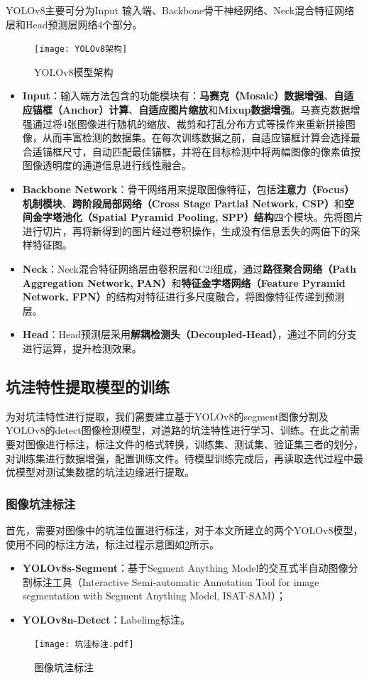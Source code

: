 \documentclass{MathorCupmodeling}
\begin{document}
	YOLOv8主要可分为Input 输入端、Backbone骨干神经网络、Neck混合特征网络层和Head预测层网络4个部分\textcolor{blue}{\cite{YOLOv8简述}}。
	\begin{figure}[H]
		\centering
		\texttt{[image: YOLOv8架构]}
		\caption{YOLOv8模型架构}
		\label{fig:YOLO架构}
	\end{figure}
	\begin{itemize}
		\item \textbf{Input}：输入端方法包含的功能模块有：\textbf{马赛克（Mosaic）数据增强}、\textbf{自适应锚框（Anchor）计算}、\textbf{自适应图片缩放}和\textbf{Mixup数据增强}\textcolor{blue}{\cite{YOLO数据增强}}。马赛克数据增强通过将4张图像进行随机的缩放、裁剪和打乱分布方式等操作来重新拼接图像，从而丰富检测的数据集。在每次训练数据之前，自适应锚框计算会选择最合适锚框尺寸，自动匹配最佳锚框，并将在目标检测中将两幅图像的像素值按图像透明度的通道信息进行线性融合。
		\item \textbf{Backbone Network}：骨干网络用来提取图像特征，包括\textbf{注意力（Focus）机制模块}、\textbf{跨阶段局部网络（Cross Stage Partial Network, CSP）}和\textbf{空间金字塔池化（Spatial Pyramid Pooling, SPP）结构}四个模块。先将图片进行切片，再将新得到的图片经过卷积操作，生成没有信息丢失的两倍下的采样特征图。
		\item \textbf{Neck}：Neck混合特征网络层由卷积层和C2f组成，通过\textbf{路径聚合网络（Path Aggregation Network, PAN）}和\textbf{特征金字塔网络（Feature Pyramid Network, FPN）}的结构对特征进行多尺度融合，将图像特征传递到预测层。
		\item \textbf{Head}：Head预测层采用\textbf{解耦检测头（Decoupled-Head）}\textcolor{blue}{\cite{Head}}，通过不同的分支进行运算，提升检测效果。
	\end{itemize}

	\subsection{坑洼特性提取模型的训练}
	为对坑洼特性进行提取，我们需要建立基于YOLOv8的segment图像分割及YOLOv8的detect图像检测模型，对道路的坑洼特性进行学习、训练。在此之前需要对图像进行标注，标注文件的格式转换，训练集、测试集、验证集三者的划分，对训练集进行数据增强，配置训练文件。待模型训练完成后，再读取迭代过程中最优模型对测试集数据的坑洼边缘进行提取。
	\subsubsection{图像坑洼标注}
	首先，需要对图像中的坑洼位置进行标注，对于本文所建立的两个YOLOv8模型，使用不同的标注方法，标注过程示意图如\textcolor{blue}{\cref{fig:图像坑洼标注}}所示。
	\begin{itemize}
		\item \textbf{YOLOv8s-Segment}：基于Segment Anything Model的交互式半自动图像分割标注工具（Interactive Semi-automatic Annotation Tool for image segmentation with Segment Anything Model, ISAT-SAM）；
		\item \textbf{YOLOv8n-Detect}：Labelimg标注。
	\end{itemize}
	\begin{figure}[H]
		\centering
		\texttt{[image: 坑洼标注.pdf]}
		\caption{图像坑洼标注}
		\label{fig:图像坑洼标注}
	\end{figure}
\end{document}
